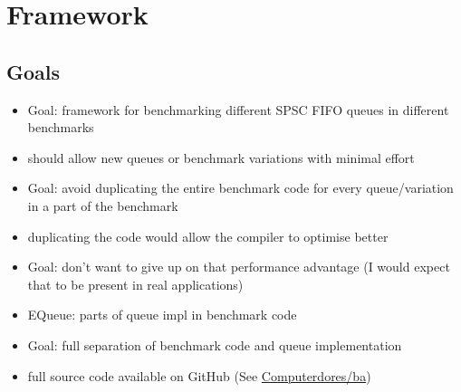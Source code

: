 \section{Framework}
\subsection{Goals}
\begin{itemize}
    \item Goal: framework for benchmarking different SPSC FIFO queues in different benchmarks
    \item should allow new queues or benchmark variations with minimal effort
    \item Goal: avoid duplicating the entire benchmark code for every queue/variation in a part of the benchmark
    \item duplicating the code would allow the compiler to optimise better
    \item Goal: don't want to give up on that performance advantage (I would expect that to be present in real applications)
    \item EQueue: parts of queue impl in benchmark code
    \item Goal: full separation of benchmark code and queue implementation
    \item full source code available on GitHub (See \href{https://github.com/Computerdores/ba}{Computerdores/ba}) 
\end{itemize}

